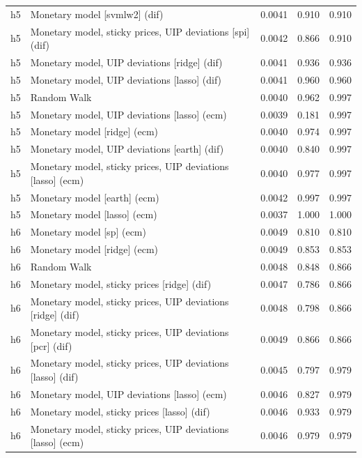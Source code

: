 \begin{ThreePartTable}
\begin{longtable}[t]{cp{5.5cm}ccc}
\addlinespace
h5 & \raggedright Monetary model [svmlw2] (dif) & 0.0041 & 0.910 & 0.910\\
h5 & \raggedright Monetary model, sticky prices, UIP deviations [spi] (dif) & 0.0042 & 0.866 & 0.910\\
h5 & \raggedright Monetary model, UIP deviations [ridge] (dif) & 0.0041 & 0.936 & 0.936\\
h5 & \raggedright Monetary model, UIP deviations [lasso] (dif) & 0.0041 & 0.960 & 0.960\\
h5 & \raggedright Random Walk & 0.0040 & 0.962 & 0.997\\
h5 & \raggedright Monetary model, UIP deviations [lasso] (ecm) & 0.0039 & 0.181 & 0.997\\
h5 & \raggedright Monetary model [ridge] (ecm) & 0.0040 & 0.974 & 0.997\\
h5 & \raggedright Monetary model, UIP deviations [earth] (dif) & 0.0040 & 0.840 & 0.997\\
h5 & \raggedright Monetary model, sticky prices, UIP deviations [lasso] (ecm) & 0.0040 & 0.977 & 0.997\\
h5 & \raggedright Monetary model [earth] (ecm) & 0.0042 & 0.997 & 0.997\\
h5 & \raggedright Monetary model [lasso] (ecm) & 0.0037 & 1.000 & 1.000\\
\addlinespace
h6 & \raggedright Monetary model [sp] (ecm) & 0.0049 & 0.810 & 0.810\\
h6 & \raggedright Monetary model [ridge] (ecm) & 0.0049 & 0.853 & 0.853\\
h6 & \raggedright Random Walk & 0.0048 & 0.848 & 0.866\\
h6 & \raggedright Monetary model, sticky prices [ridge] (dif) & 0.0047 & 0.786 & 0.866\\
h6 & \raggedright Monetary model, sticky prices, UIP deviations [ridge] (dif) & 0.0048 & 0.798 & 0.866\\
h6 & \raggedright Monetary model, sticky prices, UIP deviations [pcr] (dif) & 0.0049 & 0.866 & 0.866\\
h6 & \raggedright Monetary model, sticky prices, UIP deviations [lasso] (dif) & 0.0045 & 0.797 & 0.979\\
h6 & \raggedright Monetary model, UIP deviations [lasso] (ecm) & 0.0046 & 0.827 & 0.979\\
h6 & \raggedright Monetary model, sticky prices [lasso] (dif) & 0.0046 & 0.933 & 0.979\\
h6 & \raggedright Monetary model, sticky prices, UIP deviations [lasso] (ecm) & 0.0046 & 0.979 & 0.979\\

\end{longtable}
\end{ThreePartTable}

